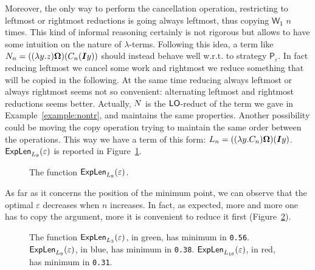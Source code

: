 Moreover, the only way to perform the cancellation operation, restricting to leftmost or rightmost reductions is going always leftmost, thus copying $\mathsf{W_1}$ $n$ times. This kind of informal reasoning certainly is not rigorous but allows to have some intuition on the nature of $\lambda$-terms. Following this idea, a term like $N_n=((\lambda y.z)\bm{\Omega})(C_n(\bm{I}y))$ should instead behave well w.r.t. to strategy $\mathsf{P}_\varepsilon$. In fact reducing leftmost we cancel some work and rightmost we reduce something that will be copied in the following. At the same time reducing always leftmost or always rightmost seems not so convenient: alternating leftmost and rightmost reductions seems better. Actually, $N$ is the $\textsf{LO}$-reduct of the term we gave in Example~\ref{example:nontr}, and maintains the same properties. Another possibility could be moving the copy operation trying to maintain the same order between the operations. This way we have a term of this form: $L_n=((\lambda y.C_n)\bm{\Omega})(\bm{I}y)$. $\textsf{ExpLen}_{L_9}(\varepsilon)$ is reported in Figure~\ref{figure:plot2}.
\begin{figure}
		\caption{The function $\textsf{ExpLen}_{L_9}(\varepsilon)$.}
		\label{figure:plot2}
	\end{figure}
As far as it concerns the position of the minimum point, we can observe that the optimal $\varepsilon$ decreases when $n$ increases. In fact, as expected, more and more one has to copy the argument, more it is convenient to reduce it first (Figure~\ref{figure:plot3}).
\begin{figure}
		\caption{The function $\textsf{ExpLen}_{L_3}(\varepsilon)$, in green, has minimum in \texttt{0.56}. $\textsf{ExpLen}_{L_9}(\varepsilon)$, in blue, has minimum in \texttt{0.38}. $\textsf{ExpLen}_{L_{16}}(\varepsilon)$, in red, has minimum in \texttt{0.31}.}
		\label{figure:plot3}
	\end{figure}
